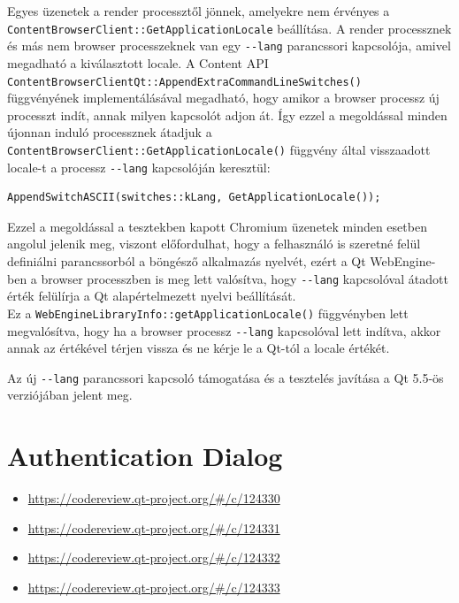 \documentclass[12pt]{report}
\let\origurl\url
\renewcommand{\url}[1]{%
    \textcolor{blue}{\origurl{#1}}
}
\newcommand{\gerrit}[1]{%
    \textcolor{qtgreen}{\origurl{https://codereview.qt-project.org/\#/c/#1}}
}
\begin{document}
Egyes üzenetek a render processztől jönnek, amelyekre nem érvényes a \\
\texttt{ContentBrowserClient::GetApplicationLocale} beállítása. A render processznek
és más nem browser processzeknek van egy \texttt{-{}-lang} parancssori kapcsolója, amivel
megadható a kiválasztott locale. A Content API \\
\texttt{ContentBrowserClientQt::AppendExtraCommandLineSwitches()} \\
függvényének implementálásával megadható, hogy amikor a browser processz új processzt indít,
annak milyen kapcsolót adjon át. Így ezzel a megoldással minden újonnan induló processznek
átadjuk a \\
\texttt{ContentBrowserClient::GetApplicationLocale()} függvény által visszaadott
locale-t a processz \texttt{-{}-lang} kapcsolóján keresztül:
\begin{verbatim}
AppendSwitchASCII(switches::kLang, GetApplicationLocale());
\end{verbatim}

Ezzel a megoldással a tesztekben kapott Chromium üzenetek minden esetben angolul jelenik meg,
viszont előfordulhat, hogy a felhasználó is szeretné felül definiálni parancssorból a
böngésző alkalmazás nyelvét, ezért a Qt WebEngine-ben a browser processzben is meg lett
valósítva, hogy \texttt{-{}-lang} kapcsolóval átadott érték felülírja a Qt alapértelmezett
nyelvi beállítását. \\
Ez a \texttt{WebEngineLibraryInfo::getApplicationLocale()} függvényben
lett megvalósítva, hogy ha a browser processz \texttt{-{}-lang} kapcsolóval lett indítva,
akkor annak az értékével térjen vissza és ne kérje le a Qt-tól a locale értékét.

Az új \texttt{-{}-lang} parancssori kapcsoló támogatása és a tesztelés javítása a Qt 5.5-ös
verziójában jelent meg.


\section{Authentication Dialog}

\begin{center}
    \begin{reviewbox}
        \begin{itemize}
            \renewcommand{\labelitemi}{\textcolor{qtgreen}{$\blacktriangleright$}}
            \item \gerrit{124330}
            \item \gerrit{124331}
            \item \gerrit{124332}
            \item \gerrit{124333}
        \end{itemize}
    \end{reviewbox}
\end{center}
\end{document}
